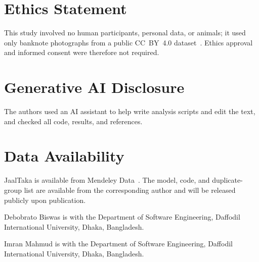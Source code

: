 \documentclass[journal]{IEEEtran}
\begin{document}
\section*{Ethics Statement}
This study involved no human participants, personal data, or animals; it used only
banknote photographs from a public CC~BY~4.0 dataset~\cite{jaaltaka_data}. Ethics
approval and informed consent were therefore not required.

\section*{Generative AI Disclosure}
The authors used an AI assistant to help write analysis scripts and edit the text, and
checked all code, results, and references.

\section*{Data Availability}
JaalTaka is available from Mendeley Data~\cite{jaaltaka_data}. The model, code, and
duplicate-group list are available from the corresponding author and will be released
publicly upon publication.




\begin{IEEEbiographynophoto}{Debobrato Biswas}
is with the Department of Software Engineering, Daffodil International University,
Dhaka, Bangladesh. %
\end{IEEEbiographynophoto}

\begin{IEEEbiographynophoto}{Imran Mahmud}
is with the Department of Software Engineering, Daffodil International University,
Dhaka, Bangladesh. %
\end{IEEEbiographynophoto}
\end{document}
